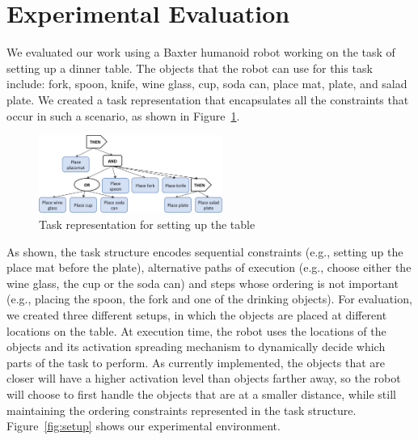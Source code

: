 \documentclass[letterpaper, 10 pt, conference]{ieeeconf}  %
\begin{document}
\section{Experimental Evaluation}
\label{evaluation}

We evaluated our work using a Baxter humanoid robot working on the task of setting up a dinner table. The objects that the robot can use for this task include: fork, spoon, knife, wine glass, cup, soda can, place mat, plate, and salad plate. We created a task representation that encapsulates all the constraints that occur in such a scenario, as shown in Figure~\ref{fig:set_table}. 

\begin{figure}
\centering
  \includegraphics[width=6cm]{set_table_task.png}
\caption{Task representation for setting up the table}
\label{fig:set_table}       %
\end{figure}

As shown, the task structure encodes sequential constraints (e.g., setting up the place mat before the plate), alternative paths of execution (e.g., choose either the wine glass, the cup or the soda can) and steps whose ordering is not important (e.g., placing the spoon, the fork and one of the drinking objects). For evaluation, we created three different setups, in which the objects are placed at different locations on the table. At execution time, the robot uses the locations of the objects and its activation spreading mechanism to dynamically decide which parts of the task to perform. As currently implemented, the objects that are closer will have a higher activation level than objects farther away, so the robot will choose to first handle the objects that are at a smaller distance, while still maintaining the ordering constraints represented in the task structure. Figure~\ref{fig:setup} shows our experimental environment.
\end{document}
